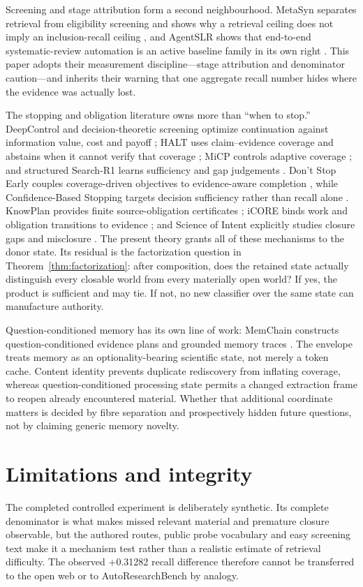\documentclass[11pt]{article}
\theoremstyle{definition}
\begin{document}
Screening and stage attribution form a second neighbourhood. MetaSyn separates retrieval from eligibility screening and shows why a retrieval ceiling does not imply an inclusion-recall ceiling \cite{metasyn2026}, and AgentSLR shows that end-to-end systematic-review automation is an active baseline family in its own right \cite{agentslr2026}. This paper adopts their measurement discipline---stage attribution and denominator caution---and inherits their warning that one aggregate recall number hides where the evidence was actually lost.

The stopping and obligation literature owns more than ``when to stop.''
DeepControl and decision-theoretic screening optimize continuation against
information value, cost and payoff \cite{deepcontrol2026,decisionstop2026}; HALT
uses claim--evidence coverage and abstains when it cannot verify that coverage
\cite{halt2026}; MiCP controls adaptive coverage \cite{micp2026}; and structured
Search-R1 learns sufficiency and gap judgements \cite{multiragstop2026}.  Don't
Stop Early couples coverage-driven objectives to evidence-aware completion
\cite{donotstopearly2026}, while Confidence-Based Stopping targets decision
sufficiency rather than recall alone \cite{confidencebasedstop2026}.  KnowPlan
provides finite source-obligation certificates \cite{knowplan2026}; iCORE binds
work and obligation transitions to evidence \cite{icore2026}; and Science of
Intent explicitly studies closure gaps and misclosure \cite{scienceintent2026}.
The present theory grants all of these mechanisms to the donor state.  Its
residual is the factorization question in Theorem~\ref{thm:factorization}: after
composition, does the retained state actually distinguish every closable world
from every materially open world?  If yes, the product is sufficient and may
tie.  If not, no new classifier over the same state can manufacture authority.

Question-conditioned memory has its own line of work: MemChain constructs
question-conditioned evidence plans and grounded memory traces
\cite{memchain2026}.  The envelope treats memory as an optionality-bearing
scientific state, not merely a token cache.  Content identity prevents duplicate
rediscovery from inflating coverage, whereas question-conditioned processing
state permits a changed extraction frame to reopen already encountered material.
Whether that additional coordinate matters is decided by fibre separation and
prospectively hidden future questions, not by claiming generic memory novelty.

\section{Limitations and integrity}
The completed controlled experiment is deliberately synthetic. Its complete denominator is what makes missed relevant material and premature closure observable, but the authored routes, public probe vocabulary and easy screening text make it a mechanism test rather than a realistic estimate of retrieval difficulty. The observed +0.31282 recall difference therefore cannot be transferred to the open web or to AutoResearchBench by analogy.
\end{document}
